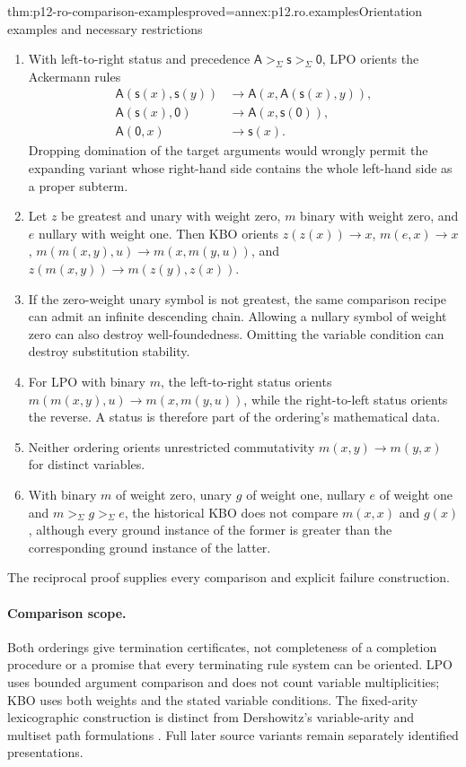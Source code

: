 \begin{hbtheorem}{thm:p12-ro-comparison-examples}{proved=annex:p12.ro.examples}{Orientation examples and necessary restrictions}
\begin{enumerate}
\item With left-to-right status and precedence
      \(\mathsf A>_\Sigma\mathsf s>_\Sigma\mathsf 0\), LPO orients
      the Ackermann rules
      \[
      \begin{aligned}
      \mathsf A(\mathsf s(x),\mathsf s(y))
        &\to\mathsf A(x,\mathsf A(\mathsf s(x),y)),\\
      \mathsf A(\mathsf s(x),\mathsf 0)
        &\to\mathsf A(x,\mathsf s(\mathsf 0)),\\
      \mathsf A(\mathsf 0,x)&\to\mathsf s(x).
      \end{aligned}
      \]
      Dropping domination of the target arguments would wrongly permit
      the expanding variant whose right-hand side contains the whole
      left-hand side as a proper subterm.
\item Let \(z\) be greatest and unary with weight zero, \(m\)
      binary with weight zero, and \(e\) nullary with weight one.
      Then KBO orients \(z(z(x))\to x\), \(m(e,x)\to x\),
      \(m(m(x,y),u)\to m(x,m(y,u))\), and
      \(z(m(x,y))\to m(z(y),z(x))\).
\item If the zero-weight unary symbol is not greatest, the same comparison
      recipe can admit an infinite descending chain. Allowing a nullary
      symbol of weight zero can also destroy well-foundedness. Omitting
      the variable condition can destroy substitution stability.
\item For LPO with binary \(m\), the left-to-right status orients
      \(m(m(x,y),u)\to m(x,m(y,u))\), while the right-to-left
      status orients the reverse. A status is therefore part of the
      ordering's mathematical data.
\item Neither ordering orients unrestricted commutativity
      \(m(x,y)\to m(y,x)\) for distinct variables.
\item With binary \(m\) of weight zero, unary \(g\) of weight one,
      nullary \(e\) of weight one and \(m>_\Sigma g>_\Sigma e\),
      the historical KBO does not compare \(m(x,x)\) and \(g(x)\),
      although every ground instance of the former is greater than
      the corresponding ground instance of the latter.
\end{enumerate}
The reciprocal proof supplies every comparison and explicit failure
construction.
\end{hbtheorem}

\paragraph{Comparison scope.}
Both orderings give termination certificates, not completeness of a
completion procedure or a promise that every terminating rule system can
be oriented. LPO uses bounded argument comparison and does not count
variable multiplicities; KBO uses both weights and the stated variable
conditions. The fixed-arity lexicographic construction is distinct from
Dershowitz's variable-arity and multiset path formulations
\cite[\S\S2,4--5]{Dershowitz1982}. Full later source variants remain
separately identified presentations.
